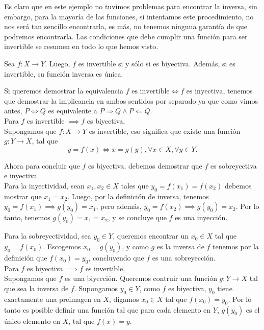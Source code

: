 \documentclass[12pt]{book}
\begin{document}
Es claro que en este ejemplo no tuvimos problemas para encontrar la inversa, sin embargo, para la mayoría de las funciones, si intentamos este procedimiento, no nos será tan sencillo encontrarla, es más, no tenemos ninguna garantía de que podremos encontrarla. Las condiciones que debe cumplir una función para ser invertible se resumen en todo lo que hemos visto.

\begin{theoremenv}\label{teo:2}
    Sea $f:X\to Y$. Luego, $f$ es invertible si y sólo si es biyectiva. Además, si es invertible, su función inversa es única.
\end{theoremenv}

\begin{proofenv}

Si queremos demostrar la equivalencia $f \text{ es invertible} \iff f \text{ es inyectiva}$, tenemos que demostrar la implicancia en ambos sentidos por separado ya que como vimos antes, $P\Leftrightarrow Q$ es equivalente a $P\Rightarrow Q \wedge P\Leftarrow Q$.\\

Para $f$ es invertible $\implies f$ es biyectiva,\\

Supongamos que $f:X\to Y$ es invertible, eso significa que existe una función $g:Y\to X$, tal que
\[
    y=f(x)\iff x=g(y), \forall x\in X, \forall y\in Y.
\]

Ahora para concluir que $f$ es biyectiva, debemos demostrar que $f$ es sobreyectiva e inyectiva.\\

Para la inyectividad, sean $x_1, x_2\in X$ tales que $y_0=f(x_1)=f(x_2)$ debemos mostrar que $x_1=x_2$. Luego, por la definición de inversa, tenemos $y_0=f(x_1)\implies g(y_0)=x_1$, pero además, $y_0=f(x_2)\implies g(y_0)=x_2$. Por lo tanto, tenemos $g(y_0)=x_1=x_2$, y se concluye que $f$ es una inyección.

Para la sobreyectividad, sea $y_0\in Y$, queremos encontrar un $x_0\in X$ tal que $y_0=f(x_0)$. Escogemos $x_0=g(y_0)$, y como $g$ es la inversa de $f$ tenemos por la definición que $f(x_0)=y_0$, concluyendo que $f$ es una sobreyección.\\

Para $f$ es biyectiva $\implies f$ es invertible,\\

Supongamos que $f$ es una biyección. Queremos contruir una función $g:Y\to X$ tal que sea la inversa de $f$. Supongamos $y_0\in Y$, como $f$ es biyectiva, $y_0$ tiene exactamente una preimagen en $X$, digamos $x_0\in X$ tal que $f(x_0)=y_0$. Por lo tanto es posible definir una función tal que para cada elemento en $Y$, $g(y_0)$ es el único elemento en $X$, tal que $f(x)=y$.\\


\end{proofenv}
\end{document}
